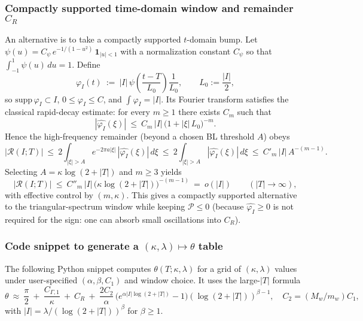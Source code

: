 \documentclass[11pt]{article}
\theoremstyle{remark}
\begin{document}
\subsubsection*{Compactly supported time-domain window and remainder $C_R$}
An alternative is to take a compactly supported $t$-domain bump. Let $\psi(u)=C_\psi\,e^{-1/(1-u^2)}\,\mathbf{1}_{|u|<1}$ with a normalization constant $C_\psi$ so that $\int_{-1}^{1}\psi(u)\,du=1$. Define
\[
  \varphi_I(t)\ :=\ |I|\,\psi\!\left(\frac{t-T}{L_0}\right)\frac{1}{L_0},\qquad L_0:=\frac{|I|}{2},
\]
so $\mathrm{supp}\,\varphi_I\subset I$, $0\le \varphi_I\le C$, and $\int \varphi_I=|I|$. Its Fourier transform satisfies the classical rapid-decay estimate: for every $m\ge 1$ there exists $C_m$ such that
\[
  |\widehat{\varphi_I}(\xi)|\ \le\ C_m\,|I|\,\big(1+|\xi|\,L_0\big)^{-m}.
\]
Hence the high-frequency remainder (beyond a chosen BL threshold $A$) obeys
\[
  |\mathcal R(I;T)|\ \le\ 2\int_{|\xi|>A} \! e^{-2\pi a|\xi|}\,|\widehat{\varphi_I}(\xi)|\,d\xi\ \le\ 2\int_{|\xi|>A} \! |\widehat{\varphi_I}(\xi)|\,d\xi\ \le\ C'_m\,|I|\,A^{-(m-1)}.
\]
Selecting $A=\kappa\log(2+|T|)$ and $m\ge 3$ yields
\[
  |\mathcal R(I;T)|\ \le\ C''_m\,|I|\,\big(\kappa\log(2+|T|)\big)^{-(m-1)}\ =\ o(|I|)\qquad (|T|\to\infty),
\]
with effective control by $(m,\kappa)$. This gives a compactly supported alternative to the triangular-spectrum window while keeping $\mathcal P\le 0$ (because $\widehat{\varphi_I}\ge 0$ is not required for the sign: one can absorb small oscillations into $C_R$).

\subsubsection*{Code snippet to generate a $(\kappa,\lambda)\mapsto \theta$ table}
The following Python snippet computes $\theta(T;\kappa,\lambda)$ for a grid of $(\kappa,\lambda)$ values under user-specified $(\alpha,\beta,C_1)$ and window choice. It uses the large-$|T|$ formula
\[
  \theta\ \approx\ \frac{\pi}{2}\ +\ \frac{C_{\Gamma,1}}{\kappa}\ +\ C_R\ +\ \frac{2C_2}{\alpha}\,\Big(e^{\alpha |I|\log(2+|T|)}-1\Big)(\log(2+|T|))^{\beta-1},\quad C_2=(M_w/m_w)C_1,
\]
with $|I|=\lambda/(\log(2+|T|))^{\beta}$ for $\beta\ge 1$.
\end{document}
